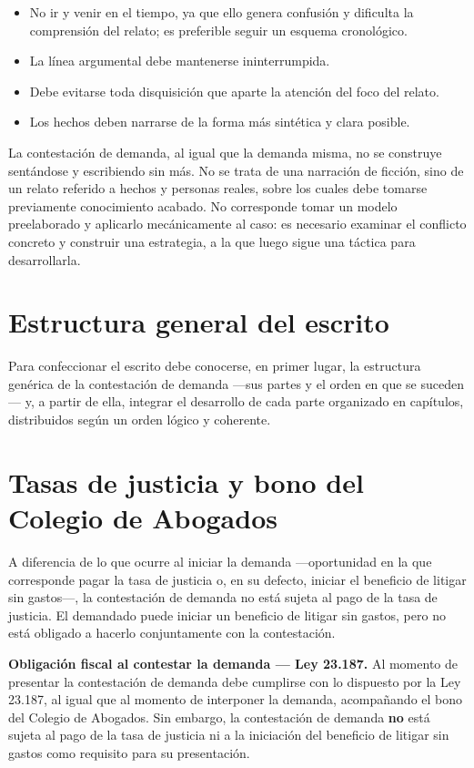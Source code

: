 \documentclass[12pt,oneside]{book}
\begin{document}
\begin{itemize}
    \item No ir y venir en el tiempo, ya que ello genera confusión y dificulta la comprensión del relato; es preferible seguir un esquema cronológico.
    \item La línea argumental debe mantenerse ininterrumpida.
    \item Debe evitarse toda disquisición que aparte la atención del foco del relato.
    \item Los hechos deben narrarse de la forma más sintética y clara posible.
\end{itemize}

\begin{important}
La contestación de demanda, al igual que la demanda misma, no se construye sentándose y escribiendo sin más. No se trata de una narración de ficción, sino de un relato referido a hechos y personas reales, sobre los cuales debe tomarse previamente conocimiento acabado. No corresponde tomar un modelo preelaborado y aplicarlo mecánicamente al caso: es necesario examinar el conflicto concreto y construir una estrategia, a la que luego sigue una táctica para desarrollarla.
\end{important}

\section{Estructura general del escrito}

Para confeccionar el escrito debe conocerse, en primer lugar, la estructura genérica de la contestación de demanda —sus partes y el orden en que se suceden— y, a partir de ella, integrar el desarrollo de cada parte organizado en capítulos, distribuidos según un orden lógico y coherente.

\section{Tasas de justicia y bono del Colegio de Abogados}

A diferencia de lo que ocurre al iniciar la demanda —oportunidad en la que corresponde pagar la tasa de justicia o, en su defecto, iniciar el beneficio de litigar sin gastos—, la contestación de demanda no está sujeta al pago de la tasa de justicia. El demandado puede iniciar un beneficio de litigar sin gastos, pero no está obligado a hacerlo conjuntamente con la contestación.

\begin{important}
\textbf{Obligación fiscal al contestar la demanda — Ley 23.187.} Al momento de presentar la contestación de demanda debe cumplirse con lo dispuesto por la Ley 23.187, al igual que al momento de interponer la demanda, acompañando el bono del Colegio de Abogados. Sin embargo, la contestación de demanda \textbf{no} está sujeta al pago de la tasa de justicia ni a la iniciación del beneficio de litigar sin gastos como requisito para su presentación.
\end{important}
\end{document}
